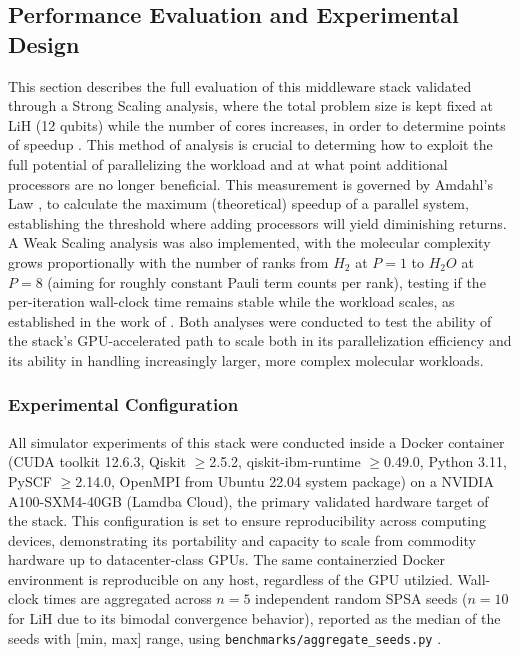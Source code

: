 \subsection{Performance Evaluation and Experimental Design}
This section describes the full evaluation of this middleware stack validated through a Strong Scaling analysis, where the
total problem size is kept fixed at LiH (12 qubits) while the number of cores increases, in order to determine points of speedup \parencite{cuboulderScaling}. This method of
analysis is crucial to determing how to exploit the full potential of parallelizing the workload and at what point additional processors are no longer beneficial.
This measurement is governed by Amdahl's Law \parencite{amdahl1967validity},
to calculate the maximum (theoretical) speedup of a parallel system, establishing the threshold where adding processors will yield diminishing returns.
A Weak Scaling analysis was also implemented, with the molecular complexity grows proportionally with the number of ranks from $H_2$ at $P{=}1$ to $H_{2}O$ at $P{=}8$ (aiming for roughly constant Pauli term counts per rank), testing if the per-iteration wall-clock time
remains stable while the workload scales, as established in the work of \textcite{gustafson1988reevaluating}.
Both analyses were conducted to test the ability of the stack's GPU-accelerated path to scale both in 
its parallelization efficiency and its ability in handling increasingly larger, more complex molecular workloads. 


\subsubsection{Experimental Configuration}  
All simulator experiments of this stack were conducted inside a Docker container (CUDA toolkit 12.6.3, Qiskit $\geq$2.5.2, qiskit-ibm-runtime $\geq$0.49.0, Python 3.11, PySCF $\geq$2.14.0, OpenMPI from Ubuntu 22.04 system package) on a NVIDIA A100-SXM4-40GB (Lamdba Cloud), the primary validated hardware target of the stack.
This configuration is set to ensure reproducibility across computing devices, demonstrating its portability and capacity to scale from commodity hardware up to datacenter-class GPUs. The same containerzied
Docker environment is reproducible on any host, regardless of the GPU utilzied. Wall-clock times are aggregated across $n=5$ independent random SPSA seeds ($n=10$ for LiH due to its bimodal convergence behavior),
reported as the median of the seeds with [min, max] range, using \texttt{benchmarks/aggregate_seeds.py} .

